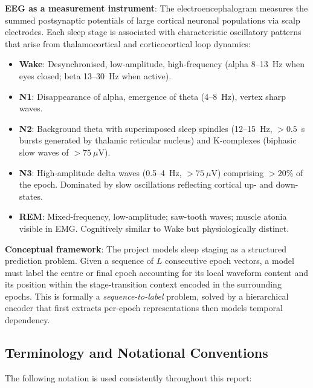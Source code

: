 \documentclass[10pt]{article}
\begin{document}
\textbf{EEG as a measurement instrument}: The electroencephalogram measures the summed postsynaptic potentials of large cortical neuronal populations via scalp electrodes. Each sleep stage is associated with characteristic oscillatory patterns that arise from thalamocortical and corticocortical loop dynamics:
\begin{itemize}
  \item \textbf{Wake}: Desynchronised, low-amplitude, high-frequency (alpha 8--13~Hz when eyes closed; beta 13--30~Hz when active).
  \item \textbf{N1}: Disappearance of alpha, emergence of theta (4--8~Hz), vertex sharp waves.
  \item \textbf{N2}: Background theta with superimposed sleep spindles (12--15~Hz, $>0.5$~s bursts generated by thalamic reticular nucleus) and K-complexes (biphasic slow waves of $>75~\mu$V).
  \item \textbf{N3}: High-amplitude delta waves (0.5--4~Hz, $>75~\mu$V) comprising $>20$\% of the epoch. Dominated by slow oscillations reflecting cortical up- and down-states.
  \item \textbf{REM}: Mixed-frequency, low-amplitude; saw-tooth waves; muscle atonia visible in EMG. Cognitively similar to Wake but physiologically distinct.
\end{itemize}

\textbf{Conceptual framework}: The project models sleep staging as a structured prediction problem. Given a sequence of $L$ consecutive epoch vectors, a model must label the centre or final epoch accounting for its local waveform content and its position within the stage-transition context encoded in the surrounding epochs. This is formally a \textit{sequence-to-label} problem, solved by a hierarchical encoder that first extracts per-epoch representations then models temporal dependency.

\subsection{Terminology and Notational Conventions}
\label{sec:terminology}

The following notation is used consistently throughout this report:
\end{document}
